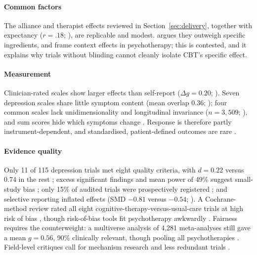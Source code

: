 \paragraph{Common factors} The alliance and therapist effects reviewed in Section~\ref{sec:delivery}, together with expectancy ($r=.18$; \citealp{constantino2018expectation}), are replicable and modest.
\citet{wampold2015common} argues they outweigh specific ingredients, and \citet{enck2019placebo} frame context effects in psychotherapy; this is contested, and it explains why trials without blinding cannot cleanly isolate CBT's specific effect.

\paragraph{Measurement} Clinician-rated scales show larger effects than self-report ($\Delta g=0.20$; \citealp{cuijpers2010selfreport}).
Seven depression scales share little symptom content (mean overlap 0.36; \citealp{fried2017symptoms}); four common scales lack unidimensionality and longitudinal invariance ($n=3{,}509$; \citealp{fried2016invariance}), and sum scores hide which symptoms change \citep{fried2015sumscores}.
Response is therefore partly instrument-dependent, and standardised, patient-defined outcomes are rare \citep{cuijpers2019targets,lambert2009clinical}.

\paragraph{Evidence quality} Only 11 of 115 depression trials met eight quality criteria, with $d=0.22$ versus 0.74 in the rest \citep{cuijpers2009quality}; excess significant findings and mean power of 49\% suggest small-study bias \citep{flint2014excess}; only 15\% of audited trials were prospectively registered \citep{cybulski2016registration}; and selective reporting inflated effects (SMD $-0.81$ versus $-0.54$; \citealp{miguel2021selective}).
A Cochrane-method review rated all eight cognitive-therapy-versus-usual-care trials at high risk of bias \citep{jakobsen2011cttau}, though risk-of-bias tools fit psychotherapy awkwardly \citep{munder2018rob}.
Fairness requires the counterweight: a multiverse analysis of 4,281 meta-analyses still gave a mean $g=0.56$, 90\% clinically relevant, though pooling all psychotherapies \citep{plessen2023multiverse}.
Field-level critiques call for mechanism research and less redundant trials \citep{cuijpers2015future,tackett2019replication}.

